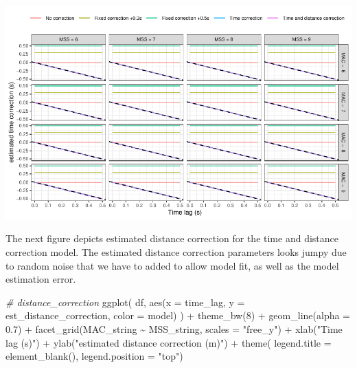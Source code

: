 \documentclass[fleqn,10pt,lineno]{wlpeerj} %
\newenvironment{Shaded}{\begin{snugshade}}{\end{snugshade}}
\newcommand{\AttributeTok}[1]{\textcolor[rgb]{0.77,0.63,0.00}{#1}}
\newcommand{\CommentTok}[1]{\textcolor[rgb]{0.56,0.35,0.01}{\textit{#1}}}
\newcommand{\DecValTok}[1]{\textcolor[rgb]{0.00,0.00,0.81}{#1}}
\newcommand{\FloatTok}[1]{\textcolor[rgb]{0.00,0.00,0.81}{#1}}
\newcommand{\FunctionTok}[1]{\textcolor[rgb]{0.00,0.00,0.00}{#1}}
\newcommand{\NormalTok}[1]{#1}
\newcommand{\SpecialCharTok}[1]{\textcolor[rgb]{0.00,0.00,0.00}{#1}}
\newcommand{\StringTok}[1]{\textcolor[rgb]{0.31,0.60,0.02}{#1}}
\begin{document}
\begin{center}\includegraphics[width=1\linewidth]{paper_files/figure-latex/unnamed-chunk-52-1} \end{center}

The next figure depicts estimated distance correction for the time and distance correction model. The estimated distance correction parameters looks jumpy due to random noise that we have to added to allow model fit, as well as the model estimation error.

\begin{Shaded}
\begin{Highlighting}[]
\CommentTok{\# distance\_correction}
\FunctionTok{ggplot}\NormalTok{(}
\NormalTok{  df,}
  \FunctionTok{aes}\NormalTok{(}\AttributeTok{x =}\NormalTok{ time\_lag, }\AttributeTok{y =}\NormalTok{ est\_distance\_correction, }\AttributeTok{color =}\NormalTok{ model)}
\NormalTok{) }\SpecialCharTok{+}
  \FunctionTok{theme\_bw}\NormalTok{(}\DecValTok{8}\NormalTok{) }\SpecialCharTok{+}
  \FunctionTok{geom\_line}\NormalTok{(}\AttributeTok{alpha =} \FloatTok{0.7}\NormalTok{) }\SpecialCharTok{+}
  \FunctionTok{facet\_grid}\NormalTok{(MAC\_string }\SpecialCharTok{\textasciitilde{}}\NormalTok{ MSS\_string, }\AttributeTok{scales =} \StringTok{"free\_y"}\NormalTok{) }\SpecialCharTok{+}
  \FunctionTok{xlab}\NormalTok{(}\StringTok{"Time lag (s)"}\NormalTok{) }\SpecialCharTok{+}
  \FunctionTok{ylab}\NormalTok{(}\StringTok{"estimated distance correction (m)"}\NormalTok{) }\SpecialCharTok{+}
  \FunctionTok{theme}\NormalTok{(}
    \AttributeTok{legend.title =} \FunctionTok{element\_blank}\NormalTok{(),}
    \AttributeTok{legend.position =} \StringTok{"top"}\NormalTok{)}
\end{Highlighting}
\end{Shaded}
\end{document}

